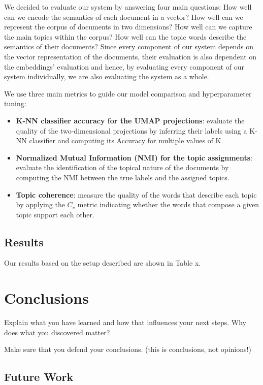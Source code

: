 \documentclass[a4paper]{article}
\begin{document}
We decided to evaluate our system by answering four main questions: How well can we encode the semantics of each document in a vector? How well can we represent the corpus of documents in two dimensions? How well can we capture the main topics within the corpus? How well can the topic words describe the semantics of their documents?
Since every component of our system depends on the vector representation of the documents, their evaluation is also dependent on the embeddings' evaluation and hence, by evaluating every component of our system individually, we are also evaluating the system as a whole.

We use three main metrics to guide our model comparison and hyperparameter tuning: 
\begin{itemize}
  \item \textbf{K-NN classifier accuracy for the UMAP projections}: evaluate the quality of the two-dimensional projections by inferring their labels using a K-NN classifier and computing its Accuracy for multiple values of K.
  \item \textbf{Normalized Mutual Information (NMI) for the topic assignments}: evaluate the identification of the topical nature of the documents by computing the NMI between the true labels and the assigned topics.
  \item \textbf{Topic coherence}: measure the quality of the words that describe each topic by applying the $C_v$ metric \citep{roder2015} indicating whether the words that compose a given topic support each other.
\end{itemize}

\subsection{Results}
Our results based on the setup described are shown in Table x.

\section{Conclusions}
Explain what you have learned and how that influences your next steps. Why does what you discovered matter?

Make sure that you defend your conclusions. (this is conclusions, not opinions!)

\subsection{Future Work}
\end{document}
